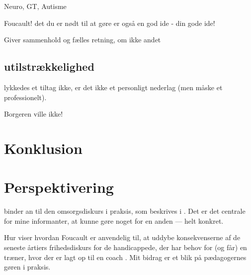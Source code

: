Neuro, GT, Autisme

Foucault! det du er nødt til at gøre er også en god ide - din gode ide!

Giver sammenhold og fælles retning, om ikke andet

\subsection{utilstrækkelighed}
lykkedes et tiltag ikke, er det ikke et personligt nederlag (men måske et professionelt).

Borgeren ville ikke!

\section{Konklusion}

\section{Perspektivering}
binder an til den omsorgsdiskurs i praksis, som beskrives i .
Det er det centrale for mine informanter, at kunne gøre noget for en anden — helt konkret.

Hur viser hvordan Foucault er anvendelig til, at uddybe konsekvenserne af de seneste årtiers frihedsdiskurs for de handicappede, der har behov for (og får) en træner, hvor der er lagt op til en coach \autocite{hurFrigorelsensMagt2015}.
Mit bidrag er et blik på pædagogernes gøren i praksis.
